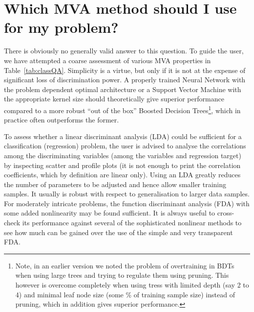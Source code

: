 \section{Which MVA method should I use for my problem?}
\label{sec:whatMVAshouldIuse}

There is obviously no generally valid answer to this question. To
guide the user, we have attempted a coarse assessment of various MVA
properties in Table~\ref{tab:classQA}.  Simplicity is a virtue, but
only if it is not at the expense of significant loss of discrimination
power. A properly trained Neural Network with the problem dependent
optimal architecture or a Support Vector Machine with the appropriate
kernel size should theoretically give superior performance compared to
a more robust ``out of the box''  Boosted Decision
Trees\footnote{Note, in an earlier version we noted the problem of
  overtraining in BDTs when using large trees and trying to regulate
  them using pruning. This however is overcome completely when using
  tress with limited depth (say 2 to 4) and minimal leaf node size
  (some \% of training sample size) instead of pruning, which in
  addition gives superior performance.}, which in practice often
outperforms the former.


To assess whether a linear discriminant analysis (LDA) could be sufficient 
for a classification (regression) problem, the user is advised to analyse the 
correlations among the discriminating variables (among the variables and regression 
target) by inspecting scatter and profile plots (it is not enough to print the 
correlation coefficients, which by definition are linear only). Using an LDA 
greatly reduces the number of parameters to be adjusted and hence allow smaller
training samples. It usually is robust with respect to generalisation
to larger data samples. For moderately intricate problems, the function discriminant 
analysis (FDA) with some added nonlinearity may be found sufficient. It is always 
useful to cross-check its performance against several of the sophisticated nonlinear
methods to see how much can be gained over the use of the simple and very
transparent FDA.

